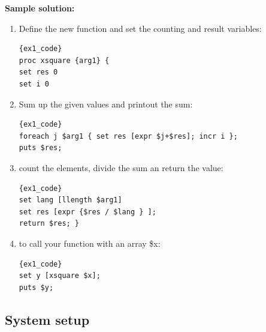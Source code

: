 \documentclass[
paper=a4,                       %
fontsize=11pt,                  %
twoside,                        %
footsepline,                    %
headsepline,                    %
headinclude=false,              %
footinclude=false,              %
pagesize,                       %
]{scrartcl}
\newtheorem{task}{Task}
\begin{document}
\newpage
\vspace{1cm}\vspace{1cm}\newline
  
        \textbf{Sample solution:}
    \begin{enumerate}
     \item Define the new function and set the counting and result variables:
	{\small
	\begin{lstlisting}{ex1_code}
proc xsquare {arg1} { 
set res 0
set i 0
	\end{lstlisting}
	}
     \item Sum up the given values and printout the sum:
       {\small
        \begin{lstlisting}[firstnumber= auto]{ex1_code}
foreach j $arg1 { set res [expr $j+$res]; incr i };
puts $res;        \end{lstlisting}
        }
     \item count the elements, divide the sum an return the value:
        {\small
        \begin{lstlisting}[firstnumber= auto]{ex1_code}
set lang [llength $arg1]
set res [expr {$res / $lang } ];
return $res; }       \end{lstlisting}
        }
     \item to call your function with an array \$x:
       {\small
        \begin{lstlisting}[firstnumber= auto]{ex1_code}
set y [xsquare $x];
puts $y;        \end{lstlisting}
        }
     \end{enumerate} 

 \subsection{System setup}\label{sec:ljliquid}
\end{document}
